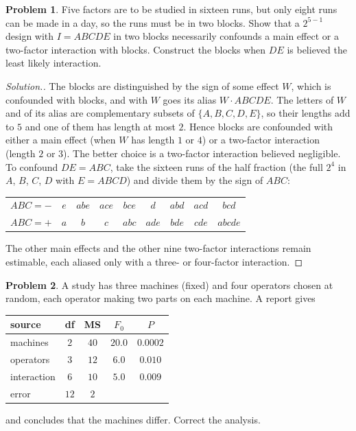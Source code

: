 \documentclass[11pt,a4paper]{article}
\numberwithin{equation}{section}
\theoremstyle{definition}
\newtheorem{problemx}{Problem}[subsection]
\newenvironment{problem}{\begin{problemx}}{\end{problemx}}
\newenvironment{solution}
  {\renewcommand{\qedsymbol}{}\begin{proof}[\textit{Solution}.]}
  {\end{proof}}
\begin{document}
\begin{problem}
Five factors are to be studied in sixteen runs, but only eight runs can be made in a day, so the runs must be in two blocks. Show that a $2^{5-1}$
design with $I = ABCDE$ in two blocks necessarily confounds a main effect or a two-factor interaction with blocks. Construct the blocks when $DE$ is
believed the least likely interaction.
\end{problem}

\begin{solution}
The blocks are distinguished by the sign of some effect $W$, which is confounded with blocks, and with $W$ goes its alias $W \cdot ABCDE$. The letters of $W$
and of its alias are complementary subsets of $\{A, B, C, D, E\}$, so their lengths add to $5$ and one of them has length at most $2$. Hence blocks are
confounded with either a main effect (when $W$ has length $1$ or $4$) or a two-factor interaction (length $2$ or $3$). The better choice is a
two-factor interaction believed negligible. To confound $DE = ABC$, take the sixteen runs of the half fraction (the full $2^4$ in $A$, $B$, $C$, $D$ with
$E = ABCD$) and divide them by the sign of $ABC$:
\begin{center}
\begin{tabular}{c|cccccccc}
$ABC = -$ & $e$ & $abe$ & $ace$ & $bce$ & $d$ & $abd$ & $acd$ & $bcd$ \\
$ABC = +$ & $a$ & $b$ & $c$ & $abc$ & $ade$ & $bde$ & $cde$ & $abcde$
\end{tabular}
\end{center}
The other main effects and the other nine two-factor interactions remain estimable, each aliased only with a three- or four-factor interaction.
\end{solution}

\begin{problem}
A study has three machines (fixed) and four operators chosen at random, each operator making two parts on each machine. A report gives
\begin{center}
\begin{tabular}{l|cccc}
source & df & MS & $F_0$ & $P$ \\
\hline
machines & $2$ & $40$ & $20.0$ & $0.0002$ \\
operators & $3$ & $12$ & $6.0$ & $0.010$ \\
interaction & $6$ & $10$ & $5.0$ & $0.009$ \\
error & $12$ & $2$ & &
\end{tabular}
\end{center}
and concludes that the machines differ. Correct the analysis.
\end{problem}
\end{document}
